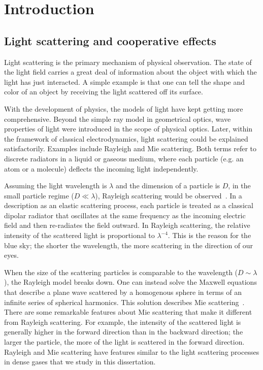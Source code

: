 \chapter{Introduction}

\section{Light scattering and cooperative effects}

Light scattering is the primary mechanism of physical observation. The state of the light field carries a great deal of information about the object with which the light has just interacted. A simple example is that one can tell the shape and color of an object by receiving the light scattered off its surface.

 
With the development of physics, the models of light have kept getting more comprehensive. Beyond the simple ray model in geometrical optics, wave properties of light were introduced in the scope of physical optics. Later, within the framework of classical electrodynamics, light scattering could be explained satisfactorily. Examples include Rayleigh and Mie scattering. Both terms refer to discrete radiators in a liquid or gaseous medium, where each particle (e.g. an atom or a molecule) deflects the incoming light independently.

Assuming the light wavelength is $\lambda$ and the dimension of a particle is $D$, in the small particle regime ($D\ll\lambda$), Rayleigh scattering would be observed~\cite{Lilienfeld:04}. In a description as an elastic scattering process, each particle is treated as a classical dipolar radiator that oscillates at the same frequency as the incoming electric field and then re-radiates the field outward. In Rayleigh scattering, the relative intensity of the scattered light is proportional to $\lambda^{-4}$. This is the reason for the blue sky; the shorter the wavelength, the more scattering in the direction of our eyes.

When the size of the scattering particles is comparable to the wavelength ($D\sim\lambda$), the Rayleigh model breaks down. One can instead solve the Maxwell equations that describe a plane wave scattered by a homogenous sphere in terms of an infinite series of spherical harmonics. This solution describes Mie scattering~\cite{1908AnP...330..377M}.  There are some remarkable features about Mie scattering that make it different from Rayleigh scattering. For example, the intensity of the scattered light is generally higher in the forward direction than in the backward direction; the larger the particle, the more of the light is scattered in the forward direction. Rayleigh and Mie scattering have features similar to the light scattering processes in dense gases that we study in this dissertation.


